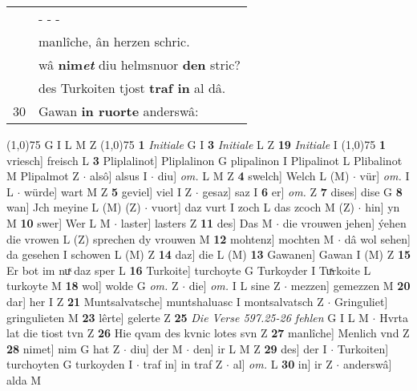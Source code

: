 \documentclass[8pt,a4paper,notitlepage]{article}
\begin{document}
\begin{table}[ht]
\begin{minipage}[t]{0.5\linewidth}
\begin{tabular}{rl}
 & \multicolumn{1}{l}{ - - - }\\ 
 & manlîche, ân herzen schric.\\ 
 & wâ \textbf{nim\textit{et}} diu helmsnuor \textbf{den} stric?\\ 
 & des Turkoiten tjost \textbf{traf in} al dâ.\\ 
30 & Gawan \textbf{in ruorte} anderswâ:\\ 
\end{tabular}
\scriptsize
\line(1,0){75} \newline
G I L M Z \newline
\line(1,0){75} \newline
\textbf{1} \textit{Initiale} G I  \textbf{3} \textit{Initiale} L Z  \textbf{19} \textit{Initiale} I  \newline
\line(1,0){75} \newline
\textbf{1} vriesch] freisch L \textbf{3} Pliplalinot] Pliplalinon G plipalinon I Plipalinot L Plibalinot M Plipalmot Z  $\cdot$ alsô] alsus I  $\cdot$ diu] \textit{om.} L M Z \textbf{4} swelch] Welch L (M)  $\cdot$ vür] \textit{om.} I L  $\cdot$ würde] wart M Z \textbf{5} geviel] viel I Z  $\cdot$ gesaz] saz I \textbf{6} er] \textit{om.} Z \textbf{7} dises] dise G \textbf{8} wan] Jch meyine L (M) (Z)  $\cdot$ vuort] daz vurt I zoch L das zcoch M (Z)  $\cdot$ hin] yn M \textbf{10} swer] Wer L M  $\cdot$ laster] lasters Z \textbf{11} des] Das M  $\cdot$ die vrouwen jehen] ýehen die vrowen L (Z) sprechen dy vrouwen M \textbf{12} mohtenz] mochten M  $\cdot$ dâ wol sehen] da gesehen I schowen L (M) Z \textbf{14} daz] die L (M) \textbf{13} Gawanen] Gawan I (M) Z \textbf{15} Er bot im nuͯ daz sper L \textbf{16} Turkoite] turchoyte G Turkoyder I Tuͯrkoite L turkoyte M \textbf{18} wol] wolde G \textit{om.} Z  $\cdot$ die] \textit{om.} I L sine Z  $\cdot$ mezzen] gemezzen M \textbf{20} dar] her I Z \textbf{21} Muntsalvatsche] muntshaluasc I montsalvatsch Z  $\cdot$ Gringuliet] gringulieten M \textbf{23} lêrte] gelerte Z \textbf{25} \textit{Die Verse 597.25-26 fehlen} G I L M   $\cdot$ Hvrta lat die tiost tvn Z \textbf{26} Hie qvam des kvnic lotes svn Z \textbf{27} manlîche] Menlich vnd Z \textbf{28} nimet] nim G hat Z  $\cdot$ diu] der M  $\cdot$ den] ir L M Z \textbf{29} des] der I  $\cdot$ Turkoiten] turchoyten G turkoyden I  $\cdot$ traf in] in traf Z  $\cdot$ al] \textit{om.} L \textbf{30} in] ir Z  $\cdot$ anderswâ] alda M \newline
\end{minipage}
\hspace{0.5cm}
\begin{minipage}[t]{0.5\linewidth}

\end{minipage}
\end{table}
\end{document}
